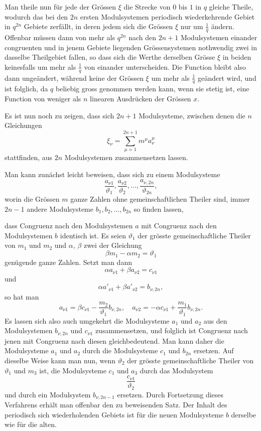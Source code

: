 \documentclass[12pt,a4paper]{article}
\begin{document}
Man theile nun f\"ur jede der Gr\"ossen $\xi$ die Strecke von $0$ bis $1$ in $q$ gleiche Theile, wodurch das bei den $2n$ ersten Modulsystemen periodisch wiederkehrende Gebiet in $q^{2n}$ Gebiete zerf\"allt, in deren jedem sich die Gr\"ossen $\xi$ nur um $\frac{1}{q}$ \"andern. Offenbar m\"ussen dann von mehr als $q^{2n}$ nach den $2n+1$ Modulsystemen einander congruenten und in jenem Gebiete liegenden Gr\"ossensystemen nothwendig zwei in dasselbe Theilgebiet fallen, so dass sich die Werthe derselben Gr\"osse $\xi$ in beiden keinesfalls um mehr als $\frac{1}{q}$ von einander unterscheiden. Die Function bleibt also dann unge\"andert, w\"ahrend keine der Gr\"ossen $\xi$ um mehr als $\frac{1}{q}$ ge\"andert wird, und ist folglich, da $q$ beliebig gross genommen werden kann, wenn sie stetig ist, eine Function von weniger als $n$ linearen Ausdr\"ucken der Gr\"ossen $x$.

Es ist nun noch zu zeigen, dass sich $2n+1$ Modulsysteme, zwischen denen die $n$ Gleichungen
\[\xi_{\nu} = \sum_{\mu=1}^{2n+1} m^{\mu} a^{\mu}_{\nu}\]
stattfinden, aus $2n$ Modulsystemen zusammensetzen lassen.

Man kann zun\"achst leicht beweisen, dass sich zu einem Modulsysteme
\[\frac{a_{\nu 1}}{\vartheta_{1}}, \frac{a_{\nu 2}}{\vartheta_{2}}, \dots, \frac{a_{\nu, 2n}}{\vartheta_{2n}},\]
worin die Gr\"ossen $m$ ganze Zahlen ohne gemeinschaftlichen Theiler sind, immer $2n-1$ andere Modulsysteme $b_{1}, b_{2}, \dots, b_{2n}$ so finden lassen,

\newpage
\noindent dass Congruenz nach den Modulsystemen $a$ mit Congruenz nach den Modulsystemen $b$ identisch ist. Es seien $\vartheta_{1}$ der gr\"osste gemeinschaftliche Theiler von $m_{1}$ und $m_{2}$ und $\alpha$, $\beta$ zwei der Gleichung
\[\beta m_{1} - \alpha m_{2} = \vartheta_{1}\]
gen\"ugende ganze Zahlen. Setzt man dann
\[\alpha a_{\nu 1} + \beta a_{\nu 2} = c_{\nu 1}\]
und
\[\alpha a'_{\nu 1} + \beta a'_{\nu 2} = b_{\nu, 2n},\]
so hat man
\[a_{\nu 1} = \beta c_{\nu 1} - \frac{m_{2}}{\vartheta_{1}} b_{\nu, 2n}, \quad a_{\nu 2} = -\alpha c_{\nu 1} + \frac{m_{1}}{\vartheta_{1}} b_{\nu, 2n}.\]
Es lassen sich also auch umgekehrt die Modulsysteme $a_{1}$ und $a_{2}$ aus den Modulsystemen $b_{\nu, 2n}$ und $c_{\nu 1}$ zusammensetzen, und folglich ist Congruenz nach jenen mit Congruenz nach diesen gleichbedeutend. Man kann daher die Modulsysteme $a_{1}$ und $a_{2}$ durch die Modulsysteme $c_{1}$ und $b_{2n}$ ersetzen. Auf dieselbe Weise kann man nun, wenn $\vartheta_{2}$ der gr\"osste gemeinschaftliche Theiler von $\vartheta_{1}$ und $m_{3}$ ist, die Modulsysteme $c_{1}$ und $a_{3}$ durch das Modulsystem
\[\frac{c_{\nu 1}}{\vartheta_{2}}\]
und durch ein Modulsystem $b_{\nu, 2n-1}$ ersetzen. Durch Fortsetzung dieses Verfahrens erh\"alt man offenbar den zu beweisenden Satz. Der Inhalt des periodisch sich wiederholenden Gebiets ist f\"ur die neuen Modulsysteme $b$ derselbe wie f\"ur die alten.
\end{document}
